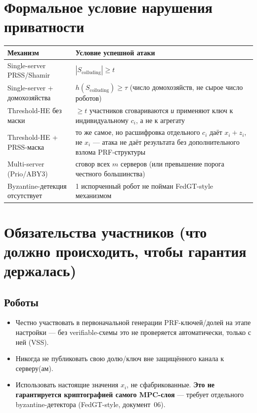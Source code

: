\documentclass[11pt]{article}
\begin{document}
\section{Формальное условие нарушения приватности}

\begin{center}
\begin{tabular}{@{}p{5.2cm}p{9.8cm}@{}}
\toprule
Механизм & Условие успешной атаки \\
\midrule
Single-server PRSS/Shamir & $|S_{\mathrm{colluding}}|\ge t$ \\
Single-server + домохозяйства & $h(S_{\mathrm{colluding}})\ge \tau$ (число
  домохозяйств, не сырое число роботов) \\
Threshold-HE без маски & $\ge t$ участников сговариваются \emph{и} применяют ключ
  к индивидуальному $c_i$, а не к агрегату \\
Threshold-HE + PRSS-маска & то же самое, но расшифровка отдельного $c_i$ даёт
  $x_i+z_i$, не $x_i$ — атака не даёт результата без дополнительного взлома
  PRF-структуры \\
Multi-server (Prio/ABY3) & сговор всех $m$ серверов (или превышение порога честного
  большинства) \\
Byzantine-детекция отсутствует & 1 испорченный робот не пойман FedGT-style
  механизмом \\
\bottomrule
\end{tabular}
\end{center}

\section{Обязательства участников (что должно происходить, чтобы гарантия держалась)}

\subsection*{Роботы}
\begin{itemize}
  \item Честно участвовать в первоначальной генерации PRF-ключей/долей на этапе
    настройки — без verifiable-схемы это не проверяется автоматически, только с
    ней (VSS).
  \item Никогда не публиковать свою долю/ключ вне защищённого канала к серверу(ам).
  \item Использовать настоящие значения $x_i$, не сфабрикованные. \textbf{Это не
    гарантируется криптографией самого MPC-слоя} — требует отдельного
    byzantine-детектора (FedGT-style, документ~06).
\end{itemize}
\end{document}
